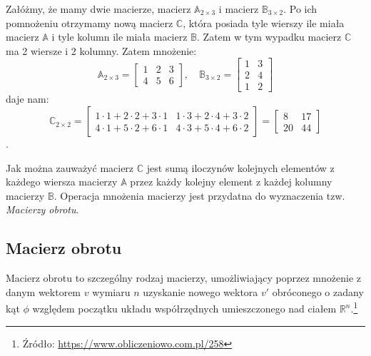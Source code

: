 \begin{przyklad}

Załóżmy, że mamy dwie macierze, macierz $\mathbb{A}_{2 \times 3}$ i macierz $\mathbb{B}_{3\times 2}$. Po ich pomnożeniu otrzymamy nową macierz $\mathbb{C}$, która posiada tyle wierszy ile miała macierz $\mathbb{A}$ i tyle kolumn ile miała macierz $\mathbb{B}$. Zatem w tym wypadku macierz $\mathbb{C}$ ma 2 wiersze i 2 kolumny. 
Zatem mnożenie:
\begin{equation*}
    \mathbb{A}_{2 \times 3} =
    \begin{bmatrix}
    1 & 2 & 3 \\
    4 & 5 & 6
    \end{bmatrix}
    ,\quad  
    \mathbb{B}_{3 \times 2} =
    \begin{bmatrix}
    1 & 3 \\
    2 & 4 \\
    1 & 2
    \end{bmatrix}
\end{equation*}
daje nam:
\begin{equation*}
    \mathbb{C}_{2\times 2} =
    \begin{bmatrix}
    1 \cdot 1 + 2 \cdot 2 + 3 \cdot 1 & 1 \cdot 3 + 2 \cdot 4 + 3 \cdot 2 \\
    4 \cdot 1 + 5 \cdot 2 + 6 \cdot 1 & 4 \cdot 3 + 5 \cdot 4 + 6 \cdot 2
    \end{bmatrix}
    =
    \begin{bmatrix}
    8 & 17 \\
    20 & 44
    \end{bmatrix}
\end{equation*}.
\end{przyklad}

Jak można zauważyć macierz $\mathbb{C}$ jest sumą iloczynów kolejnych elementów z każdego wiersza macierzy $\mathbb{A}$ przez każdy kolejny element z każdej kolumny macierzy $\mathbb{B}$.
Operacja mnożenia macierzy jest przydatna do wyznaczenia tzw. \textit{Macierzy obrotu}.




\subsection{Macierz obrotu}
Macierz obrotu to szczególny rodzaj macierzy, umożliwiający poprzez mnożenie z  danym wektorem $v$ wymiaru $n$ uzyskanie nowego wektora $v'$ obróconego o zadany kąt $\phi$ względem początku układu współrzędnych umieszczonego nad ciałem $\mathbb{R}^{n}$.\footnote{Źródło: \url{https://www.obliczeniowo.com.pl/258}}


